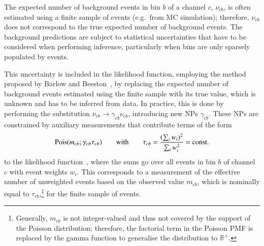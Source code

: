 The expected number of background events in bin $b$ of a channel $c$,
$\nu_{cb}$, is often estimated using a finite sample of events (e.g.\ from MC
simulation); therefore, $\nu_{cb}$ does not correspond to the true expected
number of background events. The background predictions are subject to
statistical uncertainties that have to be considered when performing inference,
particularly when bins are only sparsely populated by events.

This uncertainty is included in the likelihood function, employing the method
proposed by Barlow and Beeston~\cite{barlow1993}, by replacing the expected
number of background events estimated using the finite sample with its true
value, which is unknown and has to be inferred from data. In practice, this is
done by performing the substitution $\nu_{cb} \rightarrow \gamma_{cb} \nu_{cb}$,
introducing new NPs $\gamma_{cb}$.
%
These NPs are constrained by auxiliary measurements that contribute terms of the
form
\begin{align*}
  \operatorname{Pois}(m_{cb} ; \gamma_{cb} \tau_{cb})
  \qquad \text{with} \qquad
  \tau_{cb} = \frac{( \sum_i w_i )^2}{\sum_i w_i^2} = \text{const.}
\end{align*}
to the likelihood function~\cite{cranmer2012}, where the sums go over all events
in bin $b$ of channel $c$ with event weights $w_i$. This corresponds to a
measurement of the effective number of unweighted events based on the observed
value $m_{cb}$, which is nominally equal to $\tau_{cb}$,\footnote{Generally,
  $m_{cb}$ is not integer-valued and thus not covered by the support of the
  Poisson distribution; therefore, the factorial term in the Poisson PMF is
  replaced by the gamma function to generalise the distribution to
  $\mathbb{R}^+$.} for the finite sample of events.


